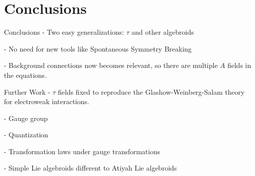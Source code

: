 \section{Conclusions}

\begin{frame}{Conclusions}
- Two easy generalizations: $\tau$ and other algebroids

- No need for new tools like Spontaneous Symmetry Breaking

- Background connections now becomes relevant, so there are multiple $A$ fields in the equations.
\end{frame}


\begin{frame}{Further Work}
    - $\tau$ fields fixed to reproduce the Glashow-Weinberg-Salam theory for electroweak interactions.
    
    - Gauge group
    
    - Quantization
    
    - Transformation laws under gauge transformations
    
    - Simple Lie algebroids different to Atiyah Lie algebroids
    
\end{frame}